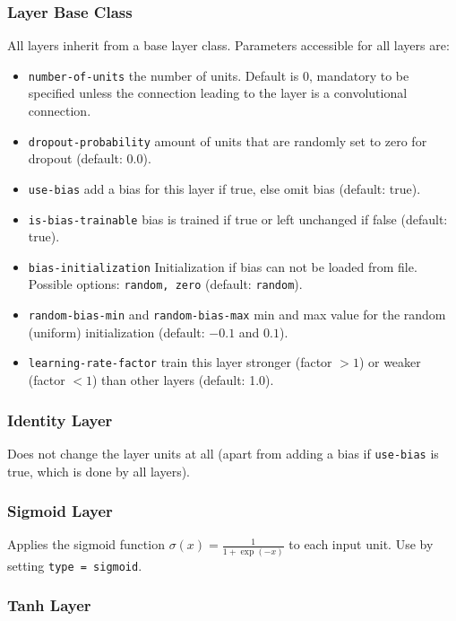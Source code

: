 \subsubsection*{Layer Base Class}

All layers inherit from a base layer class. Parameters accessible for all layers are:
\begin{itemize}
    \item \texttt{number-of-units} the number of units. Default is $ 0 $, mandatory to be specified unless the connection leading to the layer is a convolutional connection.
    \item \texttt{dropout-probability} amount of units that are randomly set to zero for dropout (default: 0.0).
    \item \texttt{use-bias} add a bias for this layer if true, else omit bias (default: true).
    \item \texttt{is-bias-trainable} bias is trained if true or left unchanged if false (default: true).
    \item \texttt{bias-initialization} Initialization if bias can not be loaded from file. Possible options: \texttt{random, zero} (default: \texttt{random}).
    \item \texttt{random-bias-min} and \texttt{random-bias-max} min and max value for the random (uniform) initialization (default: $ -0.1 $ and $ 0.1 $).
    \item \texttt{learning-rate-factor} train this layer stronger (factor $ > 1 $) or weaker (factor $ < 1 $) than other layers (default: 1.0).
\end{itemize}

\subsubsection*{Identity Layer}

Does not change the layer units at all (apart from adding a bias if \texttt{use-bias} is true, which is done by all layers).

\subsubsection*{Sigmoid Layer}

Applies the sigmoid function $ \sigma(x) = \frac{1}{1+\exp(-x)} $ to each input unit. Use by setting \texttt{type = sigmoid}.

\subsubsection*{Tanh Layer}

